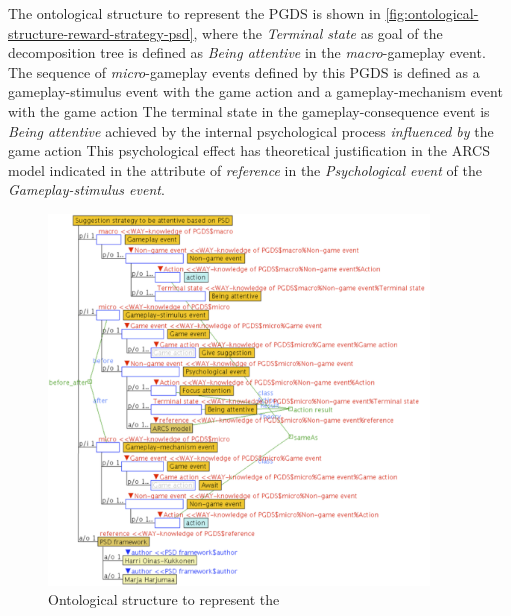 The ontological structure to represent the PGDS  is shown in \autoref{fig:ontological-structure-reward-strategy-psd}, where the \emph{Terminal state} as goal of the decomposition tree is defined as \emph{Being attentive} in the \emph{macro}-gameplay event.
The sequence of \emph{micro}-gameplay events defined by this PGDS is defined as a gameplay-stimulus event with the game action  and a gameplay-mechanism event with the game action  The terminal state in the gameplay-consequence event is \emph{Being attentive} achieved by the internal psychological process  \emph{influenced by} the game action  This psychological effect has theoretical justification in the ARCS model \cite{Keller1987} indicated in the attribute of \emph{reference} in the \emph{Psychological event} of the \emph{Gameplay-stimulus event}.

\begin{figure}[!htb]
 \caption[Ontological structure to represent the \emph{Suggestion strategy to be attentive based on PSD}]{Ontological structure to represent the }
 \label{fig:ontological-structure-reward-strategy-psd}
 \centering
 \includegraphics[width=0.9\textwidth]{images/chap-ontogacles2/ontological-structure-reward-strategy-psd.png}
 \fautor
\end{figure}

